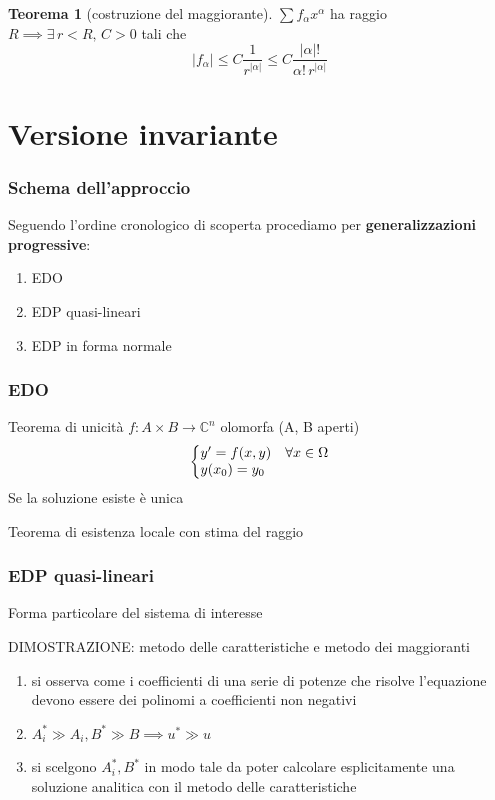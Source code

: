 \documentclass[serif,notheorems]{beamer}
\makeatletter
\theoremstyle{definition} %
\newtheorem{theorem}{Teorema}[section] %
\theoremstyle{remark}
\newenvironment{system}%
{\left\lbrace\begin{array}{@{}l@{}}}%
{\end{array}\right.}
\makeatother
\begin{document}
\begin{frame}
\begin{theorem}[costruzione del maggiorante]
$\sum f_\alpha x^\alpha$ ha raggio $R \implies \exists \, r<R, \, C>0$ tali che 
$$|f_\alpha | \leq C \frac{1}{r^{|\alpha |}} \leq C \frac{|\alpha |!}{\alpha ! \, r^{|\alpha |}}$$
\end{theorem}
\end{frame}


\section{Versione invariante}


\begin{frame}
\frametitle{Schema dell'approccio}
Seguendo l'ordine cronologico di scoperta procediamo per \textbf{generalizzazioni progressive}:
\begin{enumerate}
\item EDO
\item EDP quasi-lineari
\item EDP in forma normale
\end{enumerate}
\end{frame}


\begin{frame}
\frametitle{EDO}
Teorema di unicità $f:A\times B\rightarrow\mathbb{C}^n$ olomorfa (A, B aperti)
\begin{equation}
\begin{system}
y' = f(x,y) \quad \forall x \in \Omega \\
y(x_0)=y_0
\end{system}
\end{equation}
Se la soluzione esiste è unica
\end{frame}

\begin{frame}
Teorema di esistenza locale con stima del raggio
\end{frame}

\begin{frame}
\frametitle{EDP quasi-lineari}
Forma particolare del sistema di interesse
\end{frame}

\begin{frame}
DIMOSTRAZIONE: metodo delle caratteristiche e metodo dei maggioranti
\begin{enumerate}
\item si osserva come i coefficienti di una serie di potenze che risolve l'equazione devono essere dei polinomi a coefficienti non negativi
\item $A_i^* \gg A_i, B^* \gg B \implies u^* \gg u$
\item si scelgono $A_i^*, B^*$ in modo tale da poter calcolare esplicitamente una soluzione analitica con il metodo delle caratteristiche
\end{enumerate}
\end{frame}
\end{document}
